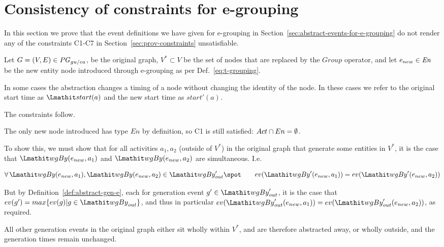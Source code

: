 

\section{Consistency of constraints for e-grouping}
\label{sec:consistency-constraints-e-grouping}

In this section we prove that the event definitions we have given for e-grouping in Section~\ref{sec:abstract-events-for-e-grouping} do not render any of the constraints C1-C7 in Section~\ref{sec:prov-constraints} unsatisfiable.


Let $G=(V,E) \in \mathit{PG}_{gu/ea}$, be the original graph,  $V^* \subset V$ be the set of nodes that are replaced by the $Group$ operator, and let  $e_{new} \in \mathit{En}$ be the new entity node introduced through e-grouping as per Def.~\ref{eq:t-grouping}. 

In some cases the abstraction changes a timing of a node without changing the identity of the node.  In these cases we refer to the original start time as $\start(a)$ and the new start time as $start'(a)$. 

The constraints follow.



The only new node introduced has type $En$ by definition, so C1 is still satisfied: $Act \cap En = \emptyset$.


To show this, we must show that for all activities $a_1,a_2$ (outside of $V^*$)  in the original graph that generate some entities in $V^*$, it is the case that  $\wgby(e_{new},a_1)$ and $\wgby(e_{new},a_2)$ are simultaneous. I.e.

\[
\forall \wgby(e_{new},a_1), \wgby(e_{new},a_2) \in \wgby'_{out} \spot \\

\qquad ev(\wgby'(e_{new},a_1)) = ev(\wgby'(e_{new},a_2))
\]

But by Definition~\ref{def:abstract-gen-e}, each for generation event  $g' \in \wgby'_{out}$, it is the case that $ev(g') = max \{ ev(g) | g \in \wgby_{out} \}$, and thus in particular $ev(\wgby'_{out}(e_{new},a_1)) = ev(\wgby'_{out}(e_{new},a_2))$, as required.

All other generation events in the original graph either sit wholly within $V^*$, and are therefore abstracted away, or wholly outside, and the generation times remain unchanged. 

